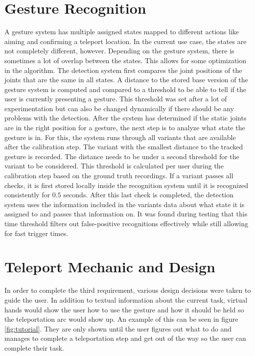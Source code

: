 \section{Gesture Recognition}
A gesture system has multiple assigned states mapped to different actions like aiming and confirming a teleport location. In the current use case, the states are not completely different, however. Depending on the gesture system, there is sometimes a lot of overlap between the states. This allows for some optimization in the algorithm. The detection system first compares the joint positions of the joints that are the same in all states. A distance to the stored base version of the gesture system is computed and compared to a threshold to be able to tell if the user is currently presenting a gesture. This threshold was set after a lot of experimentation but can also be changed dynamically if there should be any problems with the detection. After the system has determined if the static joints are in the right position for a gesture, the next step is to analyze what state the gesture is in. For this, the system runs through all variants that are available after the calibration step. The variant with the smallest distance to the tracked gesture is recorded. The distance needs to be under a second threshold for the variant to be considered. This threshold is calculated per user during the calibration step based on the ground truth recordings. If a variant passes all checks, it is first stored locally inside the recognition system until it is recognized consistently for $0.5$ seconds. After this last check is completed, the detection system uses the information included in the variants data about what state it is assigned to and passes that information on. It was found during testing that this time threshold filters out false-positive recognitions effectively while still allowing for fast trigger times.


\section{Teleport Mechanic and Design}
In order to complete the third requirement, various design decisions were taken to guide the user. In addition to textual information about the current task, virtual hands would show the user how to use the gesture and how it should be held so the teleportation arc would show up. An example of this can be seen in figure \ref{fig:tutorial}. They are only shown until the user figures out what to do and manages to complete a teleportation step and get out of the way so the user can complete their task.

